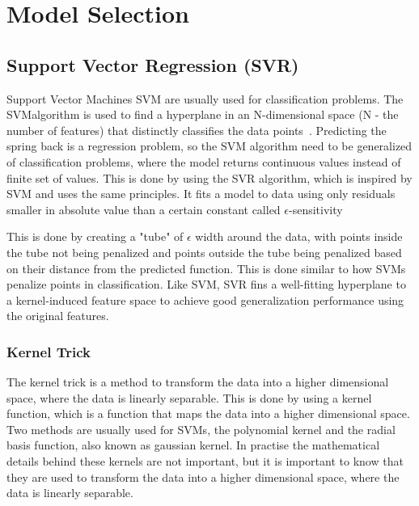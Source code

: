 \section{Model Selection}\label{sec:model-selection}

\subsection{Support Vector Regression (SVR)}\label{subsec:support-vector-regression-(svr)}
Support Vector Machines \ac{SVM} are usually used for classification problems.
The \ac{SVM}algorithm is used to find a hyperplane in an N-dimensional space (N - the
number of features) that distinctly classifies the data points~\cite[p. 42]{
    awad_efficientlearningmachines_2015}.
Predicting the spring back is a regression problem, so the \ac{SVM} algorithm
need to be
generalized of
classification problems, where the model returns continuous values instead of
finite set of values.
This is done by using the \ac{SVR} algorithm, which is inspired by  \ac{SVM}
and uses the same
principles.
It fits a model to data using only residuals smaller in absolute value than a
certain constant
called
$\epsilon$-sensitivity

This is done by creating a "tube" of $\epsilon$ width around the data, with
points inside the
tube not being
penalized and points outside the tube being penalized based on their distance
from the predicted
function.
This is done similar to how \ac{SVM}s penalize points in classification.
Like \ac{SVM}, \ac{SVR} fins a well-fitting hyperplane to a kernel-induced
feature space to
achieve good
generalization performance using the original features.
\cite[p. 369]{montesinoslopez_supportvectormachines_2022}

\subsubsection*{Kernel Trick}

The kernel trick is a method to transform the data into a higher dimensional
space, where the
data is linearly
separable.
This is done by using a kernel function, which is a function that maps the
data into a higher
dimensional space.
Two methods are usually used for \ac{SVM}s, the polynomial kernel and the
radial basis function,
also known as gaussian kernel.
\cite[p. 97-98]{muller_introductionmachinelearning_2016}
In practise the mathematical details behind these kernels are not important,
but it is important
to know that they are used to transform the data into a higher dimensional
space, where the data
is linearly separable.

